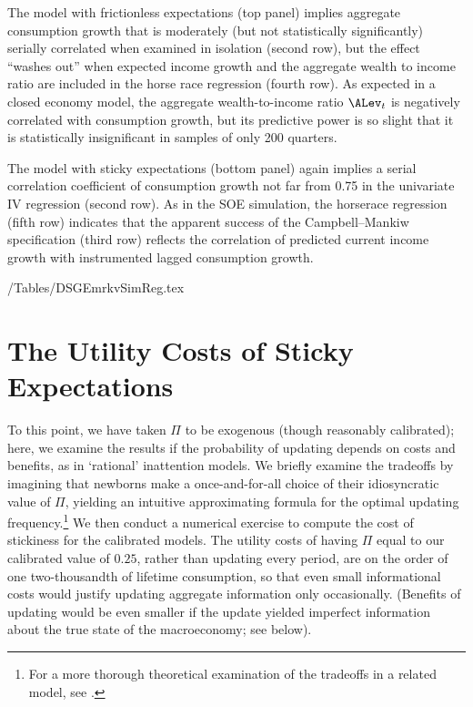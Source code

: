 \documentclass[titlepage]{\econtex}\newcommand{\texname}{cAndCwithStickyE}
\begin{document}
The model with frictionless expectations (top panel) implies aggregate consumption growth that is moderately (but not statistically significantly) serially correlated when examined in isolation (second row), but the effect ``washes out'' when expected income growth and the aggregate wealth to income ratio are included in the horse race regression (fourth row).  As expected in a closed economy model, the aggregate wealth-to-income ratio $\ALev_t$ is negatively correlated with consumption growth, but its predictive power is so slight that it is statistically insignificant in samples of only 200 quarters.

The model with sticky expectations (bottom panel) again implies a serial correlation coefficient of consumption growth not far from 0.75 in the univariate IV regression (second row).  As in the SOE simulation, the horserace regression (fifth row) indicates that the apparent success of the Campbell--Mankiw specification (third row) reflects the correlation of predicted current income growth with instrumented lagged consumption growth.

\econtexRoot/Tables/DSGEmrkvSimReg.tex



\section{The Utility Costs of Sticky Expectations}\label{sec:uCost}

To this point, we have taken $\Pi$ to be exogenous (though reasonably calibrated); here, we examine the results if the probability of updating depends on costs and benefits, as in `rational' inattention models.  We briefly examine the tradeoffs by imagining that newborns make a once-and-for-all choice of their idiosyncratic value of $\Pi$, yielding an intuitive approximating formula for the optimal updating frequency.\footnote{For a more thorough theoretical examination of the tradeoffs in a related model, see \cite{reis:inattentive}.}  We then conduct a numerical exercise to compute the cost of stickiness for the calibrated models.  The utility costs of having $\Pi$ equal to our calibrated value of $0.25$, rather than updating every period, are on the order of one two-thousandth of lifetime consumption, so that even small informational costs would justify updating aggregate information only occasionally.  (Benefits of updating would be even smaller if the update yielded imperfect information about the true state of the macroeconomy; see below).
\end{document}
